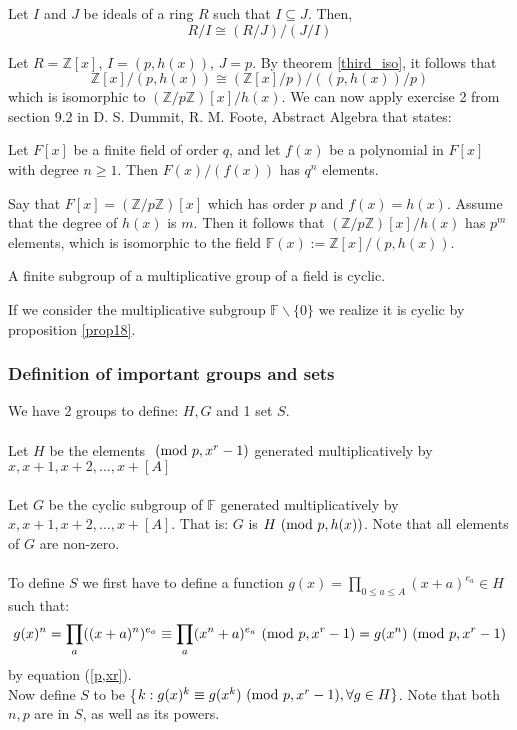 \begin{theorem}
\label{third_iso}
    Let $I$ and $J$ be ideals of a ring $R$ such that $I\subseteq J$. Then,
    \begin{equation*}
        R/I \cong (R/J)/(J/I)
    \end{equation*}
\end{theorem}
Let $R=\mathbb{Z}[x]$, $I=(p,h(x))$, $J=p$. By theorem \ref{third_iso}, it follows that
\begin{equation*}
    \mathbb{Z}[x]/(p,h(x))\cong (\mathbb{Z}[x]/p)/((p,h(x))/p)
\end{equation*}
which is isomorphic to $(\mathbb{Z}/p\mathbb{Z})[x]/h(x)$. We can now apply exercise 2 from section 9.2 in D. S. Dummit, R. M. Foote, Abstract Algebra that states:
\begin{proposition}
Let $F[x]$ be a finite field of order $q$, and let $f(x)$ be a polynomial in $F[x]$ with degree $n\geq 1$. Then $F(x)/(f(x))$ has $q^n$ elements.
\end{proposition}
Say that $F[x] = (\mathbb{Z}/p\mathbb{Z})[x]$ which has order $p$ and $f(x) = h(x)$. Assume that the degree of $h(x)$ is $m$. Then it follows that $(\mathbb{Z}/p\mathbb{Z})[x]/h(x)$ has $p^m$ elements, which is isomorphic to the field $\mathbb{F}(x):= \mathbb{Z}[x]/(p,h(x))$.
\begin{proposition}
\label{prop18}
    A finite subgroup of a multiplicative group of a field is cyclic.
\end{proposition}
If we consider the multiplicative subgroup $\mathbb{F}\backslash \{0\}$ we realize it is cyclic by proposition \ref{prop18}.
\subsubsection{Definition of important groups and sets}
We have 2 groups to define: $H,G$ and 1 set $S$.\\\\
Let $H$ be the elements $\ (\mathrm{mod}\ p, x^r-1)$ generated multiplicatively by $x, x+1, x+2, ... , x+[A]$\\\\
Let $G$ be the cyclic subgroup of $\mathbb{F}$ generated multiplicatively by $x, x+1, x+2, ... , x+[A]$. That is: $G$ is $H\ (\mathrm{mod}\ p,h(x))$. Note that all elements of $G$ are non-zero.\\\\
To define $S$ we first have to define a function $g(x)= \prod_{0\leq a\leq A}(x+a)^{e_a}\in H$ such that:
\begin{equation*}
    g(x)^n=\prod_{a}((x+a)^n)^{e_a}\equiv \prod_{a}(x^n+a)^{e_a} \ (\mathrm{mod}\ p,x^r-1) = g(x^n) \ (\mathrm{mod}\ p,x^r-1)
\end{equation*}
by equation (\ref{p,xr}).\\
Now define $S$ to be \{${k:g(x)^k\equiv g(x^k)\ (\mathrm{mod}\ p,x^r-1), \forall g\in H}\}$. Note that both $n,p$ are in $S$, as well as its powers.
